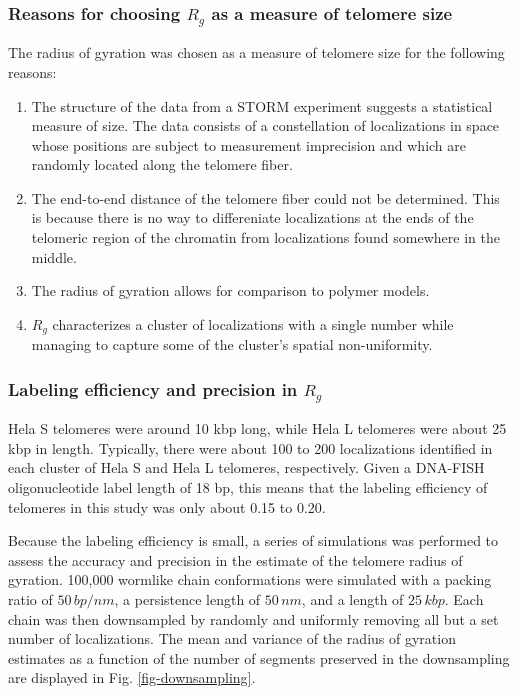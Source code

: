 \documentclass[12pt, a4paper]{article}
\begin{document}
\subsubsection{Reasons for choosing $R_g$ as a measure of telomere size}
\label{sec-1-3-2}
The radius of gyration was chosen as a measure of telomere size
for the following reasons:
\begin{enumerate}
\item The structure of the data from a STORM experiment suggests a
statistical measure of size. The data consists of a
constellation of localizations in space whose positions are
subject to measurement imprecision and which are randomly
located along the telomere fiber.
\item The end-to-end distance of the telomere fiber could not be
determined. This is because there is no way to differeniate
localizations at the ends of the telomeric region of the
chromatin from localizations found somewhere in the middle.
\item The radius of gyration allows for comparison to polymer models.
\item $R_g$ characterizes a cluster of localizations with a single
number while managing to capture some of the cluster's spatial
non-uniformity.
\end{enumerate}

\subsubsection{Labeling efficiency and precision in $R_g$}
\label{sec-1-3-3}
\label{sec-RgPrecision}
Hela S telomeres were around 10 kbp long, while Hela L telomeres
were about 25 kbp in length. Typically, there were about 100 to 200
localizations identified in each cluster of Hela S and Hela L
telomeres, respectively. Given a DNA-FISH oligonucleotide label
length of 18 bp, this means that the labeling efficiency of
telomeres in this study was only about 0.15 to 0.20.

Because the labeling efficiency is small, a series of simulations
was performed to assess the accuracy and precision in the estimate
of the telomere radius of gyration. 100,000 wormlike chain
conformations were simulated with a packing ratio of $50 \,
    bp/nm$, a persistence length of $50 \, nm$, and a length of $25 \,
    kbp$. Each chain was then downsampled by randomly and uniformly
removing all but a set number of localizations. The mean and
variance of the radius of gyration estimates as a function of the
number of segments preserved in the downsampling are displayed in
Fig. \ref{fig-downsampling}.
\end{document}
